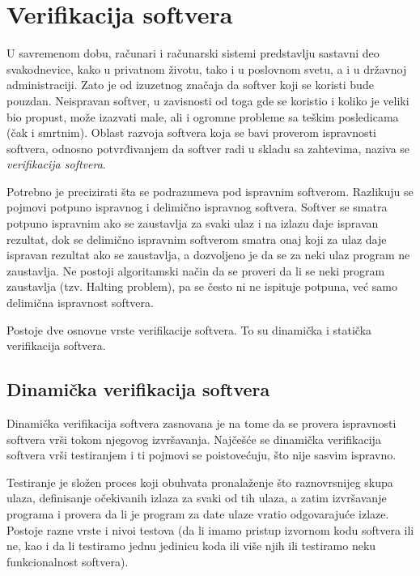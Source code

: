 \documentclass[a4paper]{article}
\theoremstyle{definition}
\begin{document}
{%
\section{Verifikacija softvera}
\label{sec:verifikacija}



\par U savremenom dobu, računari i računarski sistemi predstavlju sastavni deo svakodnevice, kako u privatnom životu, tako i u poslovnom svetu, a i u državnoj administraciji. Zato je od izuzetnog značaja da softver koji se koristi bude pouzdan. Neispravan softver, u zavisnosti od toga gde se koristio i koliko je veliki bio propust, može izazvati male, ali i ogromne probleme sa teškim posledicama (čak i smrtnim). Oblast razvoja softvera koja se bavi proverom ispravnosti softvera, odnosno potvrđivanjem da softver radi u skladu sa zahtevima, naziva se \emph{verifikacija softvera}.

\par Potrebno je precizirati šta se podrazumeva pod ispravnim softverom. Razlikuju se pojmovi potpuno ispravnog i delimično ispravnog softvera. Softver se smatra potpuno ispravnim ako se zaustavlja za svaki ulaz i na izlazu daje ispravan rezultat, dok se delimično ispravnim softverom smatra onaj koji za ulaz daje ispravan rezultat ako se zaustavlja, a dozvoljeno je da se za neki ulaz program ne zaustavlja. Ne postoji algoritamski način da se proveri da li se neki program zaustavlja (tzv. Halting problem), pa se često ni ne ispituje potpuna, već samo delimična ispravnost softvera.

\par Postoje dve osnovne vrste verifikacije softvera. To su dinamička i statička verifikacija softvera.

\subsection{Dinamička verifikacija softvera}
\label{subsec:dinamicka}

\par Dinamička verifikacija softvera zasnovana je na tome da se provera ispravnosti softvera vrši tokom njegovog izvršavanja. Najčešće se dinamička verifikacija softvera vrši testiranjem i ti pojmovi se poistovećuju, što nije sasvim ispravno.

\par Testiranje je složen proces koji obuhvata pronalaženje što raznovrsnijeg skupa ulaza, definisanje očekivanih izlaza za svaki od tih ulaza, a zatim izvršavanje programa i provera da li je program za date ulaze vratio odgovarajuće izlaze. Postoje razne vrste i nivoi testova (da li imamo pristup izvornom kodu softvera ili ne, kao i da li testiramo jednu jedinicu koda ili više njih ili testiramo neku funkcionalnost softvera).

}
\end{document}
